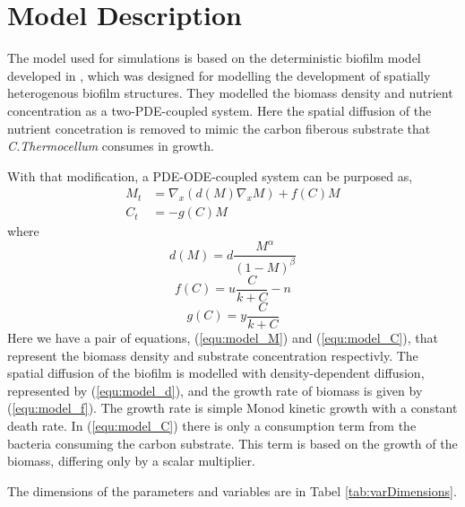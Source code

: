 \section{Model Description}
The model used for simulations is based on the deterministic biofilm model developed in \cite{eberl2001deterministic}, which was designed for modelling the development of spatially heterogenous biofilm structures.
They modelled the biomass density and nutrient concentration as a two-PDE-coupled system.
Here the spatial diffusion of the nutrient concetration is removed to mimic the carbon fiberous substrate that \textit{C.Thermocellum} consumes in growth. 

With that modification, a PDE-ODE-coupled system can be purposed as,
\begin{align} 
   M_t &= \nabla_x \left( d(M) \nabla_x M \right) + f(C) M \label{equ:model_M}\\
   C_t &= -g(C) M \label{equ:model_C}
\end{align}
where
\begin{equation} \label{equ:model_d}
  d(M) = d \frac{M^\alpha}{(1-M)^\beta}
\end{equation}
\begin{equation} \label{equ:model_f}
  f(C) = u \frac{C}{k + C} - n 
\end{equation}
\begin{equation} \label{equ:model_g}
  g(C) = y \frac{C}{k + C}
\end{equation}
Here we have a pair of equations, (\ref{equ:model_M}) and (\ref{equ:model_C}), that represent the biomass density and substrate concentration respectivly.
The spatial diffusion of the biofilm is modelled with density-dependent diffusion, represented by (\ref{equ:model_d}), and the growth rate of biomass is given by (\ref{equ:model_f}).
The growth rate is simple Monod kinetic growth with a constant death rate.
In (\ref{equ:model_C}) there is only a consumption term from the bacteria consuming the carbon substrate. This term is based on the growth of the biomass, differing only by a scalar multiplier.
 

The dimensions of the parameters and variables are in Tabel \ref{tab:varDimensions}.
  
